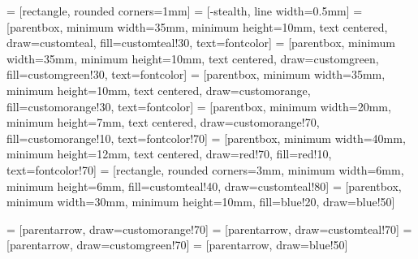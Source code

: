  = [rectangle, rounded corners=1mm]
 = [-stealth, line width=0.5mm]
 = [parentbox, minimum width=35mm, minimum height=10mm, text centered, draw=customteal, fill=customteal!30, text=fontcolor]
 = [parentbox, minimum width=35mm, minimum height=10mm, text centered, draw=customgreen, fill=customgreen!30, text=fontcolor]
 = [parentbox, minimum width=35mm, minimum height=10mm, text centered, draw=customorange, fill=customorange!30, text=fontcolor]
 = [parentbox, minimum width=20mm, minimum height=7mm, text centered, draw=customorange!70, fill=customorange!10, text=fontcolor!70]
 = [parentbox, minimum width=40mm, minimum height=12mm, text centered, draw=red!70, fill=red!10, text=fontcolor!70]
 = [rectangle, rounded corners=3mm, minimum width=6mm, minimum height=6mm, fill=customteal!40, draw=customteal!80]
 = [parentbox, minimum width=30mm, minimum height=10mm, fill=blue!20, draw=blue!50]

 = [parentarrow, draw=customorange!70]
 = [parentarrow, draw=customteal!70]
 = [parentarrow, draw=customgreen!70]
 = [parentarrow, draw=blue!50]


